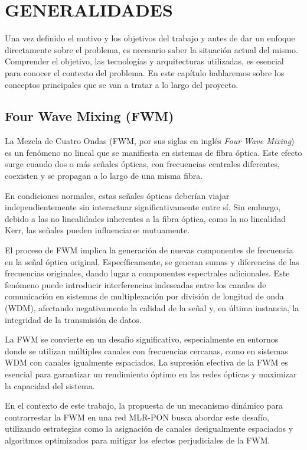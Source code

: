 \chapter[GENERALIDADES]{\Large GENERALIDADES}
\label{chap1:generalidades}
\justify %

Una vez definido el motivo y los objetivos del trabajo y antes de dar un enfoque
directamente sobre el problema, es necesario saber la situación actual del mismo.
Comprender el objetivo, las tecnologías y arquitecturas utilizadas, es esencial para conocer el contexto del problema. En este capítulo hablaremos sobre los conceptos principales que se van a tratar a lo largo del proyecto.



\section{Four Wave Mixing (FWM)}
La Mezcla de Cuatro Ondas (FWM, por sus siglas en inglés \textit{Four Wave Mixing}) es un fenómeno no lineal que se manifiesta en sistemas de fibra óptica. Este efecto surge cuando dos o más señales ópticas, con frecuencias centrales diferentes, coexisten y se propagan a lo largo de una misma fibra.

En condiciones normales, estas señales ópticas deberían viajar independientemente sin interactuar significativamente entre sí. Sin embargo, debido a las no linealidades inherentes a la fibra óptica, como la no linealidad Kerr, las señales pueden influenciarse mutuamente.

El proceso de FWM implica la generación de nuevas componentes de frecuencia en la señal óptica original. Específicamente, se generan sumas y diferencias de las frecuencias originales, dando lugar a componentes espectrales adicionales. Este fenómeno puede introducir interferencias indeseadas entre los canales de comunicación en sistemas de multiplexación por división de longitud de onda (WDM), afectando negativamente la calidad de la señal y, en última instancia, la integridad de la transmisión de datos.

La FWM se convierte en un desafío significativo, especialmente en entornos donde se utilizan múltiples canales con frecuencias cercanas, como en sistemas WDM con canales igualmente espaciados. La supresión efectiva de la FWM es esencial para garantizar un rendimiento óptimo en las redes ópticas y maximizar la capacidad del sistema.

En el contexto de este trabajo, la propuesta de un mecanismo dinámico para contrarrestar la FWM en una red MLR-PON busca abordar este desafío, utilizando estrategias como la asignación de canales desigualmente espaciados y algoritmos optimizados para mitigar los efectos perjudiciales de la FWM.





